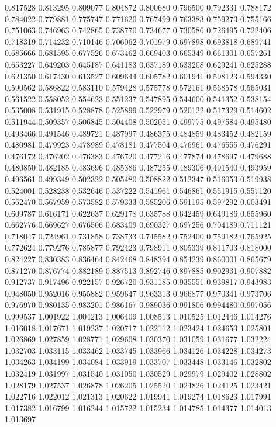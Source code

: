 0.817528
0.813295
0.809077
0.804872
0.800680
0.796500
0.792331
0.788172
0.784022
0.779881
0.775747
0.771620
0.767499
0.763383
0.759273
0.755166
0.751063
0.746963
0.742865
0.738770
0.734677
0.730586
0.726495
0.722406
0.718319
0.714232
0.710146
0.706062
0.701979
0.697898
0.693818
0.689741
0.685666
0.681595
0.677526
0.673462
0.669403
0.665349
0.661301
0.657261
0.653227
0.649203
0.645187
0.641183
0.637189
0.633208
0.629241
0.625288
0.621350
0.617430
0.613527
0.609644
0.605782
0.601941
0.598123
0.594330
0.590562
0.586822
0.583110
0.579428
0.575778
0.572161
0.568578
0.565031
0.561522
0.558052
0.554623
0.551237
0.547895
0.544600
0.541352
0.538154
0.535008
0.531915
0.528878
0.525899
0.522979
0.520122
0.517329
0.514602
0.511944
0.509357
0.506845
0.504408
0.502051
0.499775
0.497584
0.495480
0.493466
0.491546
0.489721
0.487997
0.486375
0.484859
0.483452
0.482159
0.480981
0.479923
0.478989
0.478181
0.477504
0.476961
0.476555
0.476291
0.476172
0.476202
0.476383
0.476720
0.477216
0.477874
0.478697
0.479688
0.480850
0.482185
0.483696
0.485386
0.487255
0.489306
0.491540
0.493959
0.496561
0.499349
0.502322
0.505480
0.508822
0.512347
0.516053
0.519938
0.524001
0.528238
0.532646
0.537222
0.541961
0.546861
0.551915
0.557120
0.562470
0.567959
0.573582
0.579333
0.585206
0.591195
0.597292
0.603491
0.609787
0.616171
0.622637
0.629178
0.635788
0.642459
0.649186
0.655960
0.662776
0.669627
0.676506
0.683409
0.690327
0.697256
0.704189
0.711121
0.718047
0.724961
0.731858
0.738733
0.745582
0.752400
0.759182
0.765925
0.772624
0.779276
0.785877
0.792423
0.798911
0.805339
0.811703
0.818000
0.824227
0.830383
0.836464
0.842468
0.848394
0.854239
0.860001
0.865679
0.871270
0.876774
0.882189
0.887513
0.892746
0.897885
0.902931
0.907882
0.912737
0.917496
0.922157
0.926720
0.931185
0.935551
0.939817
0.943983
0.948050
0.952016
0.955882
0.959647
0.963313
0.966877
0.970341
0.973706
0.976970
0.980135
0.983201
0.986167
0.989036
0.991806
0.994480
0.997056
0.999537
1.001922
1.004213
1.006409
1.008513
1.010525
1.012446
1.014276
1.016018
1.017671
1.019237
1.020717
1.022112
1.023424
1.024653
1.025801
1.026869
1.027859
1.028771
1.029608
1.030370
1.031059
1.031677
1.032224
1.032703
1.033115
1.033462
1.033745
1.033966
1.034126
1.034228
1.034273
1.034263
1.034199
1.034084
1.033919
1.033707
1.033448
1.033146
1.032802
1.032419
1.031997
1.031540
1.031050
1.030529
1.029979
1.029402
1.028802
1.028179
1.027537
1.026878
1.026205
1.025520
1.024826
1.024125
1.023421
1.022716
1.022012
1.021313
1.020622
1.019941
1.019274
1.018623
1.017991
1.017382
1.016799
1.016244
1.015722
1.015234
1.014785
1.014377
1.014013
1.013697
